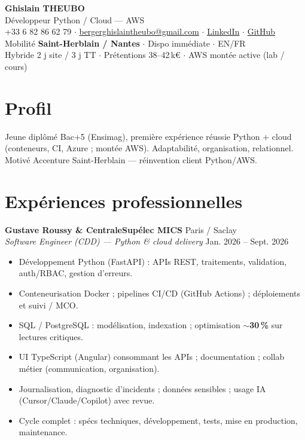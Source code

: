 \documentclass[10pt,a4paper]{article}
\begin{document}
\begin{center}
{\LARGE\bfseries Ghislain THEUBO}\\[1pt]
{\large D\'eveloppeur Python / Cloud --- AWS}\\[2pt]
+33 6 82 86 62 79 $\cdot$
\href{mailto:bergerghislaintheubo@gmail.com}{bergerghislaintheubo@gmail.com} $\cdot$
\href{https://www.linkedin.com/in/berger-ghislain}{LinkedIn} $\cdot$
\href{https://github.com/Bergerghislain}{GitHub}\\[1pt]
Mobilit\'e \textbf{Saint-Herblain / Nantes} $\cdot$ Dispo imm\'ediate $\cdot$ EN/FR\\[1pt]
\small Hybride 2 j site / 3 j TT $\cdot$ Pr\'etentions 38--42\,k€ $\cdot$ AWS mont\'ee active (lab / cours)
\end{center}

\section{Profil}
Jeune dipl\^om\'e Bac+5 (Ensimag), premi\`ere exp\'erience r\'eussie Python + cloud (conteneurs, CI, Azure ; mont\'ee AWS). Adaptabilit\'e, organisation, relationnel. Motiv\'e Accenture Saint-Herblain --- r\'einvention client Python/AWS.

\section{Exp\'eriences professionnelles}
\textbf{Gustave Roussy \& CentraleSup\'elec MICS} \hfill Paris / Saclay\\
\textit{Software Engineer (CDD) --- Python \& cloud delivery} \hfill Jan. 2026 -- Sept. 2026
\begin{itemize}
  \item D\'eveloppement Python (FastAPI) : APIs REST, traitements, validation, auth/RBAC, gestion d'erreurs.
  \item Conteneurisation Docker ; pipelines CI/CD (GitHub Actions) ; d\'eploiements et suivi / MCO.
  \item SQL / PostgreSQL : mod\'elisation, indexation ; optimisation $\sim$\textbf{30\,\%} sur lectures critiques.
  \item UI TypeScript (Angular) consommant les APIs ; documentation ; collab m\'etier (communication, organisation).
  \item Journalisation, diagnostic d'incidents ; donn\'ees sensibles ; usage IA (Cursor/Claude/Copilot) avec revue.
  \item Cycle complet : sp\'ecs techniques, d\'eveloppement, tests, mise en production, maintenance.
\end{itemize}
\end{document}
